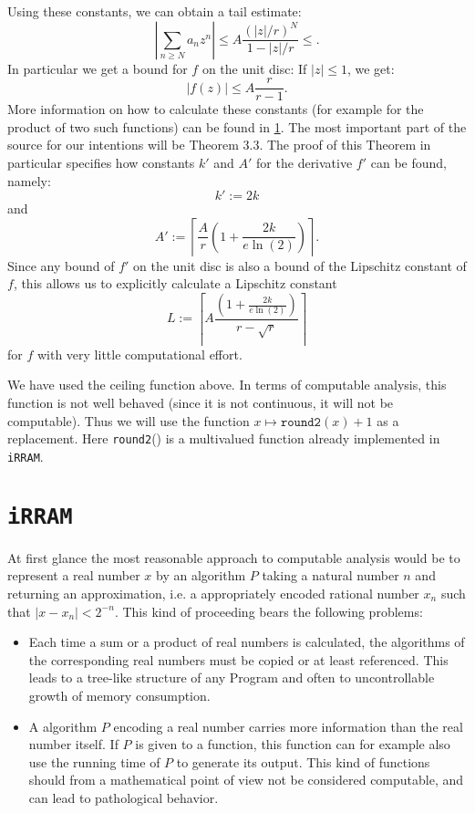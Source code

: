 \documentclass{article}
\newcommand{\irram}{\texttt{iRRAM}\xspace}
\newcommand{\ir}[1]{\texttt{#1}}
\begin{document}
Using these constants, we can obtain a tail estimate:
\[ \left|\sum_{n \geq N} a_n z^n\right| \leq A \frac{(|z|/r)^N}{1- |z|/r} \leq. \]
In particular we get a bound for $f$ on the unit disc: If $|z|\leq 1$, we get:
\[ |f(z)| \leq A\frac r{r-1}. \]
More information on how to calculate these constants (for example for the product of two such functions) can be found in \ref{}. The most important part of the source for our intentions will be Theorem 3.3. The proof of this Theorem in particular specifies how constants $k'$ and $A'$ for the derivative $f'$ can be found, namely:
\[ k' := 2 k \]
and
\[ A' := \left\lceil \frac{A}{r} \left(1+ \frac{2k}{e \ln(2)}\right)\right\rceil. \]
Since any bound of $f'$ on the unit disc is also a bound of the Lipschitz constant of $f$, this allows us to explicitly calculate a Lipschitz constant
\[ L := \left\lceil A \frac{\left(1 + \frac{2k}{e\ln(2)}\right)}{r-\sqrt{r}}\right\rceil \]
for $f$ with very little computational effort.

We have used the ceiling function above. In terms of computable analysis, this function is not well behaved (since it is not continuous, it will not be computable). Thus we will use the function $x \mapsto \ir{round2}(x) +1$ as a replacement. Here \ir{round2}() is a multivalued function already implemented in \irram.

\section{\irram}

At first glance the most reasonable approach to computable analysis would be to represent a real number $x$ by an algorithm $P$ taking a natural number $n$ and returning an approximation, i.e. a appropriately encoded rational number $x_n$ such that $|x-x_n|<2^{-n}$. This kind of proceeding bears the following problems:
\begin{itemize}
\item Each time a sum or a product of real numbers is calculated, the algorithms of the corresponding real numbers must be copied or at least referenced. This leads to a tree-like structure of any Program and often to uncontrollable growth of memory consumption.
\item A algorithm $P$ encoding a real number carries more information than the real number itself. If $P$ is given to a function, this function can for example also use the running time of $P$ to generate its output. This kind of functions should from a mathematical point of view not be considered computable, and can lead to pathological behavior.
\end{itemize}
\end{document}

